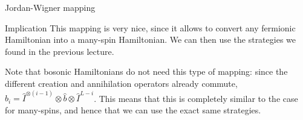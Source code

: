 \documentclass[a4paper]{article}
\begin{document}
\begin{parag}{Jordan-Wigner mapping}
    \begin{subparag}{Implication}
        This mapping is very nice, since it allows to convert any fermionic Hamiltonian into a many-spin Hamiltonian. We can then use the strategies we found in the previous lecture.

        Note that bosonic Hamiltonians do not need this type of mapping: since the different creation and annihilation operators already commute, $\hat{b}_i = \hat{I}^{\otimes \left(i-1\right)} \otimes \hat{b} \otimes \hat{I}^{L - i}$. This means that this is completely similar to the case for many-spins, and hence that we can use the exact same strategies.
    \end{subparag}
\end{parag}
\end{document}

